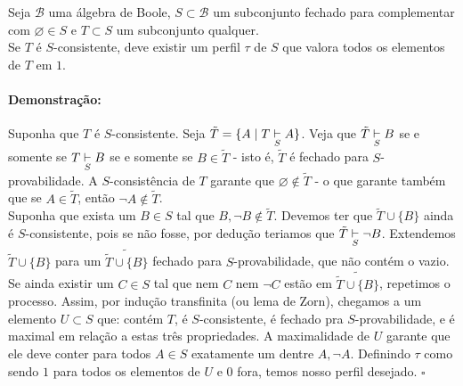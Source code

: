 \documentclass[11pt]{article}
\newcommand{\pulinho}{\vspace{.5cm}}
\theoremstyle{definition}
\theoremstyle{definition}
\theoremstyle{definition}
\theoremstyle{definition}
\newtheorem*{prop*}{Proposição}
\newenvironment{proposicao*}{
\definecolor{shadecolor}{HTML}{FFDBDF}
\begin{shaded}
\begin{prop*}
}
{
\end{prop*}
\end{shaded}
}
\theoremstyle{definition}
\theoremstyle{definition}
\theoremstyle{definition}
\theoremstyle{definition}
\newtheorem*{definition*}{Definição}
\newenvironment{definicao*}{
\definecolor{shadecolor}{HTML}{defcfc}
\begin{shaded}
\begin{definition*}
}
{
\end{definition*}
\end{shaded}
}
\theoremstyle{definition}
\theoremstyle{definition}
\theoremstyle{definition}
\theoremstyle{definition}
\newenvironment{prova}{\paragraph{Demonstração:}}{\hfill$\square$ 
\pulinho
}
\theoremstyle{definition}
\theoremstyle{definition}
\begin{document}



\begin{proposicao*}[$S$-completude]
   Seja $\mathcal{B}$ uma álgebra de Boole, $S \subset \mathcal{B}$ um subconjunto fechado para complementar com $\varnothing \in S$ e $T \subset S$ um subconjunto qualquer. \\
   
   Se $T$ é $S$-consistente, deve existir um perfil $\tau$ de $S$ que valora todos os elementos de $T$ em $1$.
\end{proposicao*}
\begin{prova}
  Suponha que $T$ é $S$-consistente. Seja $\tilde{T} = \{A \mid T \underset{S}{\vdash} A\}$. Veja que $\tilde{T} \underset{S}{\vdash} B$ se e somente se $T \underset{S}{\vdash} B$ se e somente se $B \in \tilde{T}$ - isto é, $\tilde{T}$ é fechado para $S$-provabilidade. A $S$-consistência de $T$ garante que $\varnothing \notin \tilde{T}$ - o que garante também que se $A \in \tilde{T}$, então $\lnot A \notin \tilde{T}$.\\
   
  Suponha que exista um $B \in S$ tal que $B, \lnot B \notin \tilde{T}$. Devemos ter que $\tilde{T} \cup \{B\}$ ainda é $S$-consistente, pois se não fosse, por dedução teriamos que $\tilde{T} \underset{S}{\vdash} \lnot B$. Extendemos $\tilde{T} \cup \{B\}$ para um $\widetilde{\tilde{T} \cup \{B\}}$ fechado para $S$-provabilidade, que não contém o vazio. Se ainda existir um $C \in S$ tal que nem $C$ nem $\lnot C$ estão em $\widetilde{\tilde{T} \cup \{B\}}$, repetimos o processo. Assim, por indução transfinita (ou lema de Zorn), chegamos a um elemento $U \subset S$ que: contém $T$, é $S$-consistente, é fechado pra $S$-provabilidade, e é maximal em relação a estas três propriedades. A maximalidade de $U$ garante que ele deve conter para todos $A \in S$ exatamente um dentre $A, \lnot A$. Definindo $\tau$ como sendo $1$ para todos os elementos de $U$ e $0$ fora, temos nosso perfil desejado.
\end{prova}
\end{document}
